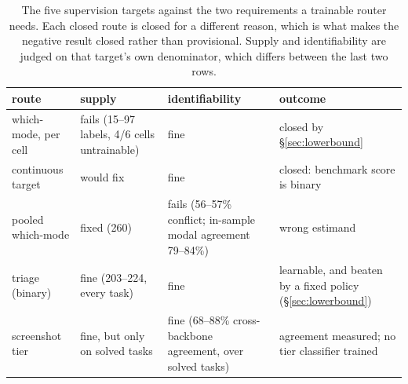 \begin{table}[tp]
\centering
\caption{The five supervision targets against the two requirements a trainable router needs. Each closed route is closed for a different reason, which is what makes the negative result closed rather than provisional. Supply and identifiability are judged on that target's own denominator, which differs between the last two rows.}
\label{tab:pb07}
\footnotesize
\setlength{\tabcolsep}{3pt}
\begin{tabular}{@{}
  >{\raggedright\arraybackslash}p{}
  >{\raggedright\arraybackslash}p{}
  >{\raggedright\arraybackslash}p{}
  >{\raggedright\arraybackslash}p{}@{}}
\toprule
\begin{minipage}[b]{\linewidth}\raggedright
route
\end{minipage} & \begin{minipage}[b]{\linewidth}\raggedright
supply
\end{minipage} & \begin{minipage}[b]{\linewidth}\raggedright
identifiability
\end{minipage} & \begin{minipage}[b]{\linewidth}\raggedright
outcome
\end{minipage} \\
\midrule
which-mode, per cell & fails (15--97 labels, 4/6 cells untrainable) & fine & closed by \S\ref{sec:lowerbound} \\
continuous target & would fix & fine & closed: benchmark score is binary \\
pooled which-mode & fixed (260) & fails (56--57\% conflict; in-sample modal agreement 79--84\%) & wrong estimand \\
triage (binary) & fine (203--224, every task) & fine & learnable, and beaten by a fixed policy (\S\ref{sec:lowerbound}) \\
screenshot tier & fine, but only on solved tasks & fine (68--88\% cross-backbone agreement, over solved tasks) & agreement measured; no tier classifier trained \\
\bottomrule
\end{tabular}
\end{table}
